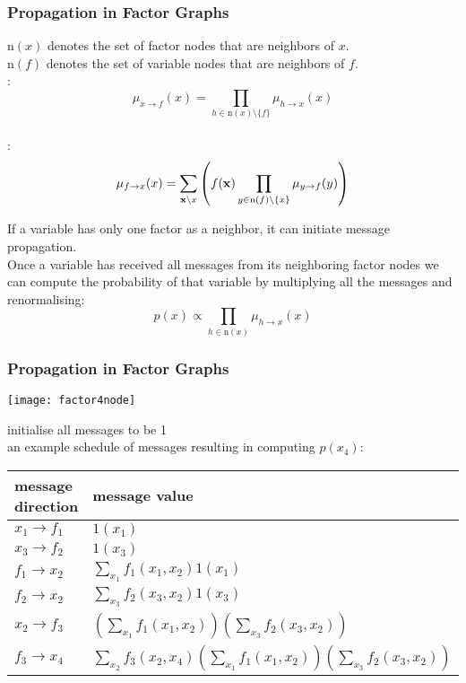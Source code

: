\begin{frame}
\frametitle{Propagation in Factor Graphs}

\vspace*{-2ex}
${\mathrm n}(x)$ denotes the set of factor nodes that are neighbors of
$x$.\\
${\mathrm n}(f)$ denotes the set of variable nodes that are
neighbors of $f$.  \\[2ex]

:
\[
\mu_{x\rightarrow f}(x) = \prod_{h \in {\mathrm n}(x)\setminus\{f\}}
\mu_{h\rightarrow x} (x)
\] \\[-2ex]

:
\[
\mu_{f \rightarrow x}(x) = \sum_{\mathbf x\setminus x} \left( f(\mathbf x)
  \prod_{y\in {\mathrm n}(f)\setminus \{x\}} \mu_{y\rightarrow f}(y)
\right)
\]

If a variable has only one factor as a neighbor, it can initiate
message propagation.\\[2ex]

Once a variable has received all messages from its neighboring
factor nodes we can compute the probability of that variable by
multiplying all the messages and renormalising:
\[
p(x) \propto \prod_{h \in {\mathrm n}(x)}
\mu_{h\rightarrow x} (x)
\]
\end{frame}
\begin{frame}
\frametitle{Propagation in Factor Graphs}

\centerline{\texttt{[image: factor4node]}}

initialise all messages to be 1\\

an example schedule of messages resulting in computing $p(x_4)$:\\

\begin{tabular}{ll}
\hline message direction & message value \\ \hline
$x_1 \rightarrow f_1$ & $1(x_1)$ \\
$x_3 \rightarrow f_2$ & $1(x_3)$ \\
$f_1 \rightarrow x_2$ & $\sum_{x_1} f_1(x_1,x_2) 1(x_1)$ \\
$f_2 \rightarrow x_2$ & $\sum_{x_3} f_2(x_3,x_2) 1(x_3)$ \\
$x_2 \rightarrow f_3$ & $\left( \sum_{x_1} f_1(x_1,x_2) \right)
\left(\sum_{x_3} f_2(x_3,x_2) \right)$ \\ 
$f_3 \rightarrow x_4$ & $\sum_{x_2} f_3(x_2,x_4) \left( \sum_{x_1}
f_1(x_1,x_2) \right) \left(\sum_{x_3} f_2(x_3,x_2) \right)$ \\ \hline
\end{tabular}

\end{frame}
